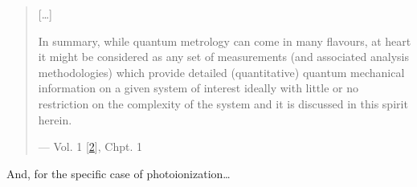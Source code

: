 \documentclass[letterpaper,table,10pt,english]{jupyterBook}
\begin{document}
\begin{quote}
\sphinxAtStartPar
{[}…{]}

\sphinxAtStartPar
In summary, while quantum metrology can come in many flavours, at heart it might be considered as any set of measurements (and associated analysis methodologies) which provide detailed (quantitative) quantum mechanical information on a given system of interest \sphinxhyphen{} ideally with little or no restriction on the complexity of the system \sphinxhyphen{} and it is discussed in this spirit herein.

\begin{flushright}
--- Vol. 1 {[}\hyperlink{cite.backmatter/bibliography:id663}{2}{]}, Chpt. 1
\end{flushright}
\end{quote}

\sphinxAtStartPar
And, for the specific case of photoionization…
\end{document}
